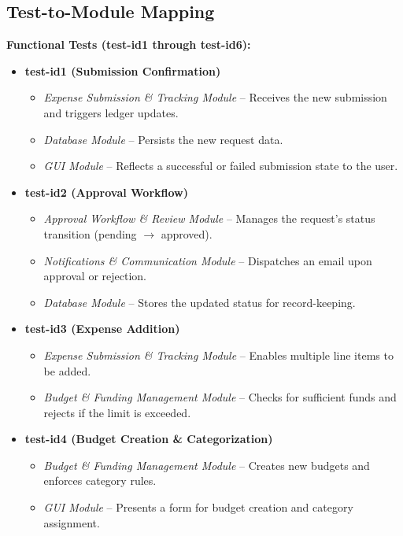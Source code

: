 \documentclass[12pt, titlepage]{article}
\begin{document}
\subsection{Test-to-Module Mapping}

\textbf{Functional Tests (test-id1 through test-id6):}

\begin{itemize}
  \item \textbf{test-id1 (Submission Confirmation)}
    \begin{itemize}
      \item \emph{Expense Submission \& Tracking Module} – Receives the new submission and triggers ledger updates.
      \item \emph{Database Module} – Persists the new request data.
      \item \emph{GUI Module} – Reflects a successful or failed submission state to the user.
    \end{itemize}

  \item \textbf{test-id2 (Approval Workflow)}
    \begin{itemize}
      \item \emph{Approval Workflow \& Review Module} – Manages the request’s status transition (pending \(\rightarrow\) approved).
      \item \emph{Notifications \& Communication Module} – Dispatches an email upon approval or rejection.
      \item \emph{Database Module} – Stores the updated status for record-keeping.
    \end{itemize}

  \item \textbf{test-id3 (Expense Addition)}
    \begin{itemize}
      \item \emph{Expense Submission \& Tracking Module} – Enables multiple line items to be added.
      \item \emph{Budget \& Funding Management Module} – Checks for sufficient funds and rejects if the limit is exceeded.
    \end{itemize}

  \item \textbf{test-id4 (Budget Creation \& Categorization)}
    \begin{itemize}
      \item \emph{Budget \& Funding Management Module} – Creates new budgets and enforces category rules.
      \item \emph{GUI Module} – Presents a form for budget creation and category assignment.
    \end{itemize}


\end{itemize}
\end{document}
